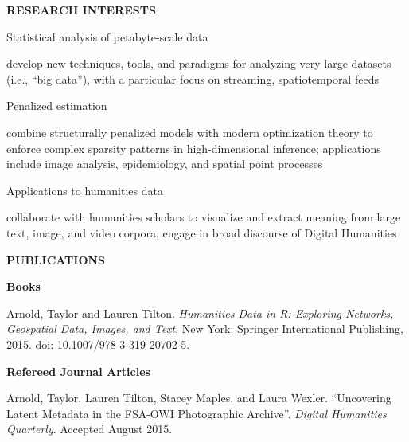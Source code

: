 \documentclass[12pt]{article}
\newcommand{\years}[1]{\marginnote{\scriptsize #1}} %
\begin{document}
\vspace{24pt}

{\bf RESEARCH INTERESTS}
\vspace{12pt}

Statistical analysis of petabyte-scale data
\begin{adjustwidth}{16pt}{16pt}
develop new techniques, tools, and paradigms for analyzing very large
datasets (i.e., “big data”), with a particular focus on streaming,
spatiotemporal feeds
\end{adjustwidth} \vspace{6pt}

Penalized estimation
\begin{adjustwidth}{16pt}{16pt}
combine structurally penalized models with modern optimization theory to
enforce complex sparsity patterns in high-dimensional inference; applications
include image analysis, epidemiology, and spatial point processes
\end{adjustwidth} \vspace{6pt}

Applications to humanities data
\begin{adjustwidth}{16pt}{16pt}
collaborate with humanities scholars to visualize and extract meaning from
large text, image, and video corpora; engage in broad discourse of
Digital Humanities
\end{adjustwidth} \vspace{6pt}
\newpage

{\bf PUBLICATIONS}
\vspace{12pt}

{\bf Books}
\vspace{12pt}


\years{2015}Arnold, Taylor and Lauren Tilton. {\it Humanities Data in R: Exploring Networks, Geospatial Data, Images, and Text}. New York: Springer International Publishing, 2015. doi: 10.1007/978-3-319-20702-5.

\vspace{12pt}
{\bf Refereed Journal Articles}
\vspace{12pt}

\years{2015}Arnold, Taylor, Lauren Tilton, Stacey Maples, and Laura Wexler. “Uncovering Latent Metadata in the FSA-OWI Photographic Archive”. {\it Digital Humanities Quarterly}. Accepted August 2015. \vspace{0.25cm}
\end{document}
